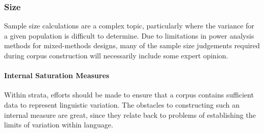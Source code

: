 







\sepline
\subsubsection{Size}
Sample size calculations are a complex topic, particularly where the variance for a given population is difficult to determine.  Due to limitations in power analysis methods for mixed-methods designs, many of the sample size judgements required during corpus construction will necessarily include some expert opinion.



\paragraph{Internal Saturation Measures}
Within strata, efforts should be made to ensure that a corpus contains sufficient data to represent linguistic variation.  The obstacles to constructing such an internal measure are great, since they relate back to problems of establishing the limits of variation within language.

